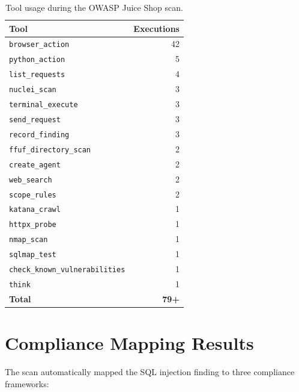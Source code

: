 \documentclass[12pt,a4paper,twoside]{report}
\begin{document}
\begin{table}[H]
\centering
\caption{Tool usage during the OWASP Juice Shop scan.}
\label{tab:toolusage}
\begin{tabular}{lr}
\toprule
\textbf{Tool} & \textbf{Executions} \\
\midrule
\texttt{browser\_action}           & 42 \\
\texttt{python\_action}            & 5 \\
\texttt{list\_requests}            & 4 \\
\texttt{nuclei\_scan}              & 3 \\
\texttt{terminal\_execute}         & 3 \\
\texttt{send\_request}             & 3 \\
\texttt{record\_finding}           & 3 \\
\texttt{ffuf\_directory\_scan}     & 2 \\
\texttt{create\_agent}             & 2 \\
\texttt{web\_search}               & 2 \\
\texttt{scope\_rules}              & 2 \\
\texttt{katana\_crawl}             & 1 \\
\texttt{httpx\_probe}              & 1 \\
\texttt{nmap\_scan}                & 1 \\
\texttt{sqlmap\_test}              & 1 \\
\texttt{check\_known\_vulnerabilities} & 1 \\
\texttt{think}                     & 1 \\
\midrule
\textbf{Total}                     & \textbf{79+} \\
\bottomrule
\end{tabular}
\end{table}

\section{Compliance Mapping Results}

The scan automatically mapped the SQL injection finding to three compliance frameworks:
\end{document}

